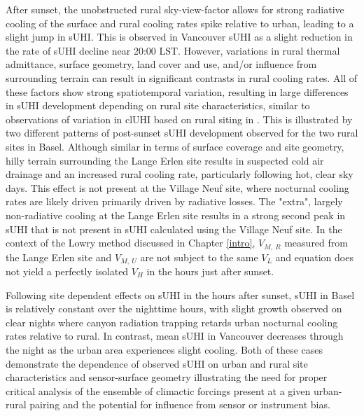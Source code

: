 \begin{bibunit}
After sunset, the unobstructed rural sky-view-factor allows for strong radiative cooling of the surface and rural cooling rates spike relative to urban, leading to a slight jump in sUHI. This is observed in Vancouver sUHI as a slight reduction in the rate of sUHI decline near 20:00 LST. However, variations in rural thermal admittance, surface geometry, land cover and use, and/or influence from surrounding terrain can result in significant contrasts in rural cooling rates. All of these factors show strong spatiotemporal variation, resulting in large differences in sUHI development depending on rural site characteristics, similar to observations of variation in clUHI based on rural siting in \citep{Runnalls2000}. This is illustrated by two different patterns of post-sunset sUHI development observed for the two rural sites in Basel. Although similar in terms of surface coverage and site geometry, hilly terrain surrounding the Lange Erlen site results in suspected cold air drainage and an increased rural cooling rate, particularly following hot, clear sky days. This effect is not present at the Village Neuf site, where nocturnal cooling rates are likely driven primarily driven by radiative losses. The "extra", largely non-radiative cooling at the Lange Erlen site results in a strong second peak in sUHI that is not present in sUHI calculated using the Village Neuf site. In the context of the Lowry method discussed in Chapter \ref{intro}, $V_{M, \ R}$ measured from the Lange Erlen site and $V_{M, \ U}$ are not subject to the same $V_{L}$ and equation does not yield a perfectly isolated $V_{H}$ in the hours just after sunset. 

Following site dependent effects on sUHI in the hours after sunset, sUHI in Basel is relatively constant over the nighttime hours, with slight growth observed on clear nights where canyon radiation trapping retards urban nocturnal cooling rates relative to rural. In contrast, mean sUHI in Vancouver decreases through the night as the urban area experiences slight cooling. Both of these cases demonstrate the dependence of observed sUHI on urban and rural site characteristics and sensor-surface geometry illustrating the need for proper critical analysis of the ensemble of climactic forcings present at a given urban-rural pairing and the potential for influence from sensor or instrument bias.



\end{bibunit}
